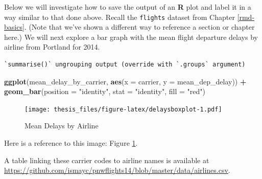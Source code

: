 \documentclass[12pt,twoside]{reedthesis}
\newenvironment{Shaded}{\begin{snugshade}}{\end{snugshade}}
\newcommand{\DataTypeTok}[1]{\textcolor[rgb]{0.13,0.29,0.53}{#1}}
\newcommand{\KeywordTok}[1]{\textcolor[rgb]{0.13,0.29,0.53}{\textbf{#1}}}
\newcommand{\NormalTok}[1]{#1}
\newcommand{\OperatorTok}[1]{\textcolor[rgb]{0.81,0.36,0.00}{\textbf{#1}}}
\newcommand{\StringTok}[1]{\textcolor[rgb]{0.31,0.60,0.02}{#1}}
\begin{document}
\clearpage

Below we will investigate how to save the output of an \textbf{R} plot and label it in a way similar to that done above. Recall the \texttt{flights} dataset from Chapter \ref{rmd-basics}. (Note that we've shown a different way to reference a section or chapter here.) We will next explore a bar graph with the mean flight departure delays by airline from Portland for 2014.
\begin{Shaded}
\end{Shaded}
\begin{verbatim}
`summarise()` ungrouping output (override with `.groups` argument)
\end{verbatim}
\begin{Shaded}
\begin{Highlighting}[]
\KeywordTok{ggplot}\NormalTok{(mean_delay_by_carrier, }\KeywordTok{aes}\NormalTok{(}\DataTypeTok{x =}\NormalTok{ carrier, }\DataTypeTok{y =}\NormalTok{ mean_dep_delay)) }\OperatorTok{+}
\StringTok{  }\KeywordTok{geom_bar}\NormalTok{(}\DataTypeTok{position =} \StringTok{"identity"}\NormalTok{, }\DataTypeTok{stat =} \StringTok{"identity"}\NormalTok{, }\DataTypeTok{fill =} \StringTok{"red"}\NormalTok{)}
\end{Highlighting}
\end{Shaded}
\begin{figure}
\centering
\texttt{[image: thesis\_files/figure-latex/delaysboxplot-1.pdf]}
\caption{\label{fig:delaysboxplot}Mean Delays by Airline}
\end{figure}
Here is a reference to this image: Figure \ref{fig:delaysboxplot}.

A table linking these carrier codes to airline names is available at \url{https://github.com/ismayc/pnwflights14/blob/master/data/airlines.csv}.

\clearpage
\end{document}
